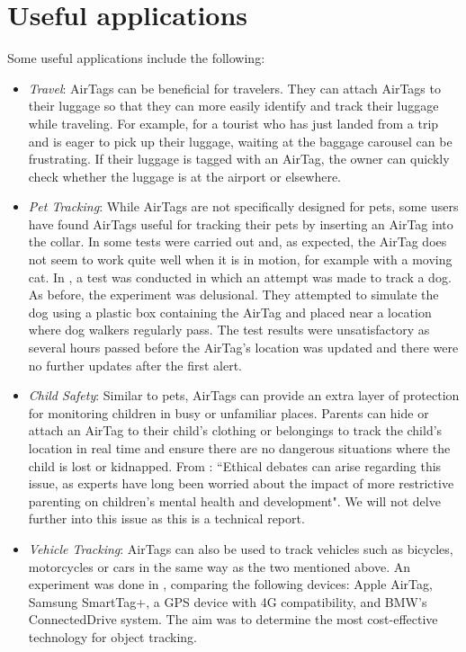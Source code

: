 \documentclass[english]{article}
\begin{document}
\section{Useful applications}\label{appl}
Some useful applications include the following:
\begin{itemize}
  \item \textit{Travel}: AirTags can be beneficial for travelers. They can attach AirTags to their luggage so that they can more easily identify and track their luggage while traveling. For example, for a tourist who has just landed from a trip and is eager to pick up their luggage, waiting at the baggage carousel can be frustrating. If their luggage is tagged with an AirTag, the owner can quickly check whether the luggage is at the airport or elsewhere.
  \item \textit{Pet Tracking}: While AirTags are not specifically designed for pets, some users have found AirTags useful for tracking their pets by inserting an AirTag into the collar. In \cite{KittyCatGO2024} some tests were carried out and, as expected, the AirTag does not seem to work quite well when it is in motion, for example with a moving cat. In \cite{Src2024}, a test was conducted in which an attempt was made to track a dog. As before, the experiment was delusional. They attempted to simulate the dog using a plastic box containing the AirTag and placed near a location where dog walkers regularly pass. The test results were unsatisfactory as several hours passed before the AirTag’s location was updated and there were no further updates after the first alert.
  \item \textit{Child Safety}: Similar to pets, AirTags can provide an extra layer of protection for monitoring children in busy or unfamiliar places. Parents can hide or attach an AirTag to their child’s clothing or belongings to track the child's location in real time and ensure there are no dangerous situations where the child is lost or kidnapped. From \cite{Kelly_2023}: ``Ethical debates can arise regarding this issue, as experts have long been worried about the impact of more restrictive parenting on children’s mental health and development". We will not delve further into this issue as this is a technical report.
  \item \textit{Vehicle Tracking}: AirTags can also be used to track vehicles such as bicycles, motorcycles or cars in the same way as the two mentioned above. An experiment was done in \cite{Maric2023}, comparing the following devices: Apple AirTag, Samsung SmartTag+, a GPS device with 4G compatibility, and BMW's ConnectedDrive system. The aim was to determine the most cost-effective technology for object tracking.

\end{itemize}
\end{document}
